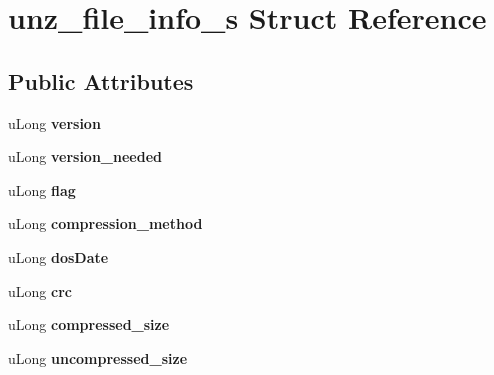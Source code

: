 \hypertarget{structunz__file__info__s}{}\section{unz\+\_\+file\+\_\+info\+\_\+s Struct Reference}
\label{structunz__file__info__s}
\subsection*{Public Attributes}
\begin{DoxyCompactItemize}
\item 
\mbox{\label{structunz__file__info__s_a635f933b26b636d8314cef61af62fcef}} 
u\+Long {\bfseries version}
\item 
\mbox{\label{structunz__file__info__s_a1578aca2bb7fed658f9f94c78d00288e}} 
u\+Long {\bfseries version\+\_\+needed}
\item 
\mbox{\label{structunz__file__info__s_adff7171a3114d55e5532c593b1779ecc}} 
u\+Long {\bfseries flag}
\item 
\mbox{\label{structunz__file__info__s_aaaca88f0ebec5c1cfebb436b8e70a774}} 
u\+Long {\bfseries compression\+\_\+method}
\item 
\mbox{\label{structunz__file__info__s_a14bd7da84cada0f4b1455d60274eef91}} 
u\+Long {\bfseries dos\+Date}
\item 
\mbox{\label{structunz__file__info__s_a6d741cb2df07794d7a4794841148893b}} 
u\+Long {\bfseries crc}
\item 
\mbox{\label{structunz__file__info__s_a35ee9d733879c87565e40a545fe46fb6}} 
u\+Long {\bfseries compressed\+\_\+size}
\item 
\mbox{\label{structunz__file__info__s_a7696a98511bc57e389485e5313a9c2bf}} 
u\+Long {\bfseries uncompressed\+\_\+size}
\item 
\mbox{\label{structunz__file__info__s_ae4f2f81a5301f7df9014838a56a496c6}} 

\end{DoxyCompactItemize}
